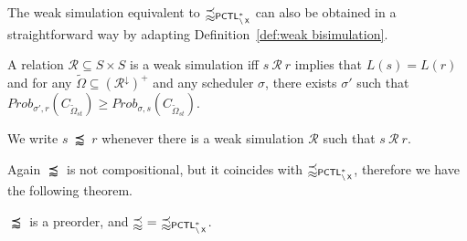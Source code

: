 \documentclass{LMCS}
\DeclareMathOperator{\X}{\text{\sf X}}
\newcommand{\WSi}{\precapprox}
\newcommand{\PCTL}{{\sf PCTL}}
\newcommand{\MC}[1]{\mathcal{#1}}
\newcommand{\SEPCTLSWN}{\precapprox_{\PCTL^{*}_{\backslash\X}}}
\newcommand{\MEASURE}{\mathit{Prob}}
\newcommand{\DOWNWARD}[2]{#1^{\downarrow}#2}
\begin{document}
The weak simulation equivalent to $\SEPCTLSWN$ can also be obtained in a straightforward way by adapting Definition~\ref{def:weak bisimulation}.
\begin{defi}\label{def:weak simulation}
A relation $\MC{R}\subseteq S\times S$ is a
weak simulation iff $s~\MC{R}~r$ implies that $L(s)=L(r)$ and for any $\widetilde{\Omega}\subseteq(\DOWNWARD{\MC{R}}{})^+$ and any scheduler $\sigma$, there exists $\sigma'$ such that $\MEASURE_{\sigma',r}(C_{\widetilde{\Omega}_{\mathit{st}}})\geq\MEASURE_{\sigma,s}(C_{\widetilde{\Omega}_{\mathit{st}}})$.

We write $s~\WSi~r$ whenever there is a weak simulation $\MC{R}$ such that $s~\MC{R}~r$.
\end{defi}

Again $\WSi$ is not compositional, but it coincides with $\SEPCTLSWN$,
therefore we have the following theorem.
\begin{thm}\label{thm:weak simulation and PCTL}
$\WSi$ is a preorder, and $\WSi~=~\SEPCTLSWN$.
\end{thm}
\end{document}
